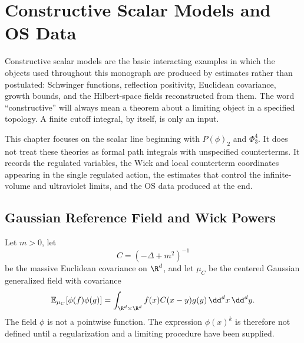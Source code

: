 \chapter{Constructive Scalar Models and OS Data}
\label{ch:constructive-scalar-models-os-data}

\ConventionsEuclidean

Constructive scalar models are the basic interacting examples in which the
objects used throughout this monograph are produced by estimates rather than
postulated: Schwinger functions, reflection positivity, Euclidean covariance,
growth bounds, and the Hilbert-space fields reconstructed from them.  The
word ``constructive'' will always mean a theorem about a limiting object in a
specified topology.  A finite cutoff integral, by itself, is only an input.

This chapter focuses on the scalar line beginning with \(P(\phi)_2\) and
\(\Phi^4_3\).  It does not treat these theories as formal path integrals
with unspecified counterterms.  It records the regulated variables, the Wick
and local counterterm coordinates appearing in the single regulated action,
the estimates that control the infinite-volume and ultraviolet limits, and
the OS data produced at the end.

\section{Gaussian Reference Field and Wick Powers}

Let \(m>0\), let
\[
  C=(-\Delta+m^2)^{-1}
\]
be the massive Euclidean covariance on \(\R^d\), and let \(\mu_C\) be the
centered Gaussian generalized field with covariance
\begin{equation}
  \mathbb E_{\mu_C}[\phi(f)\phi(g)]
  =
  \int_{\R^d\times\R^d} f(x)C(x-y)g(y)\,\dd^dx\,\dd^dy .
  \label{eq:constructive-gaussian-covariance}
\end{equation}
The field \(\phi\) is not a pointwise function.  The expression
\(\phi(x)^k\) is therefore not defined until a regularization and a limiting
procedure have been supplied.

